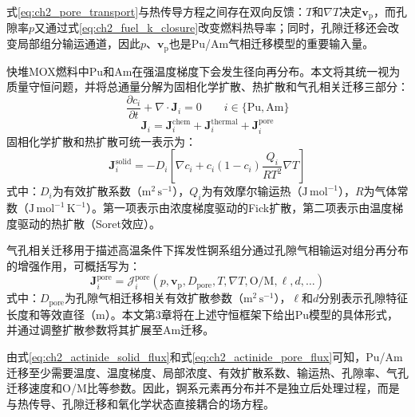 式\eqref{eq:ch2_pore_transport}与热传导方程之间存在双向反馈：$T$和$\nabla T$决定$\mathbf v_{\mathrm p}$，而孔隙率$p$又通过式\eqref{eq:ch2_fuel_k_closure}改变燃料热导率；同时，孔隙迁移还会改变局部组分输运通道，因此$p$、$\mathbf v_{\mathrm p}$也是Pu/Am气相迁移模型的重要输入量。

\label{subsec:ch2_actinide_transport}

快堆MOX燃料中Pu和Am在强温度梯度下会发生径向再分布。本文将其统一视为质量守恒问题，并将总通量分解为固相化学扩散、热扩散和气孔相关迁移三部分：
\begin{equation}
	\frac{\partial c_i}{\partial t}
	+\nabla\cdot\mathbf J_i=0
	\qquad
	i\in\{\mathrm{Pu},\mathrm{Am}\}
	\label{eq:ch2_actinide_conservation}
\end{equation}
\begin{equation}
	\mathbf J_i
	=\mathbf J_i^{\mathrm{chem}}
	+\mathbf J_i^{\mathrm{thermal}}
	+\mathbf J_i^{\mathrm{pore}}
	\label{eq:ch2_actinide_flux_decomposition}
\end{equation}
固相化学扩散和热扩散可统一表示为：
\begin{equation}
	\mathbf J_i^{\mathrm{solid}}
	=-D_i
	\left[
		\nabla c_i
		+c_i(1-c_i)
		\frac{Q_i}{RT^2}\nabla T
		\right]
	\label{eq:ch2_actinide_solid_flux}
\end{equation}
\noindent 式中：$D_i$为有效扩散系数（$\mathrm{m^2\,s^{-1}}$），$Q_i$为有效摩尔输运热（$\mathrm{J\,mol^{-1}}$），$R$为气体常数（$\mathrm{J\,mol^{-1}\,K^{-1}}$）。第一项表示由浓度梯度驱动的Fick扩散，第二项表示由温度梯度驱动的热扩散（Soret效应）。

气孔相关迁移用于描述高温条件下挥发性锕系组分通过孔隙气相输运对组分再分布的增强作用，可概括写为：
\begin{equation}
	\mathbf J_i^{\mathrm{pore}}
	=\mathcal J_i^{\mathrm{pore}}
	\left(
	p,\mathbf v_{\mathrm p},D_{\mathrm{pore}},T,\nabla T,\mathrm{O/M},\ell,d,\ldots
	\right)
	\label{eq:ch2_actinide_pore_flux}
\end{equation}
\noindent 式中：$D_{\mathrm{pore}}$为孔隙气相迁移相关有效扩散参数（$\mathrm{m^2\,s^{-1}}$），$\ell$和$d$分别表示孔隙特征长度和等效直径（$\mathrm{m}$）。本文第3章将在上述守恒框架下给出Pu模型的具体形式，并通过调整扩散参数将其扩展至Am迁移。

由式\eqref{eq:ch2_actinide_solid_flux}和式\eqref{eq:ch2_actinide_pore_flux}可知，Pu/Am迁移至少需要温度、温度梯度、局部浓度、有效扩散系数、输运热、孔隙率、气孔迁移速度和O/M比等参数。因此，锕系元素再分布并不是独立后处理过程，而是与热传导、孔隙迁移和氧化学状态直接耦合的场方程。


